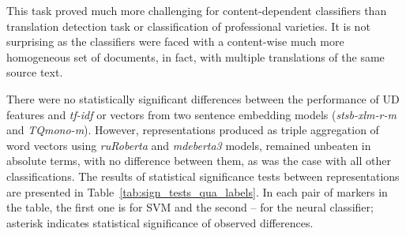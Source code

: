 This task proved much more challenging for content-dependent classifiers than translation detection task or classification of professional varieties. It is not surprising as the classifiers were faced with a content-wise much more homogeneous set of documents, in fact, with multiple translations of the same source text. 

There were no statistically significant differences between the performance of UD features and \textit{tf-idf} or vectors from two sentence embedding models (\textit{stsb-xlm-r-m} and \textit{TQmono-m}).
However, representations produced as triple aggregation of word vectors using \textit{ruRoberta} and \textit{mdeberta3} models, remained unbeaten in absolute terms, with no difference between them, as was the case with all other classifications. 
The results of statistical significance tests between representations are presented in Table~\ref{tab:sign_tests_qua_labels}. In each pair of markers in the table, the first one is for SVM and the second -- for the neural classifier; asterisk indicates statistical significance of observed differences.

